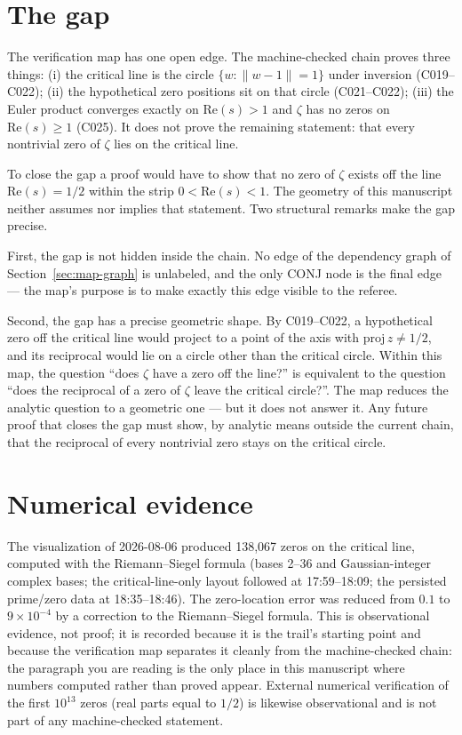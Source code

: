 \documentclass[sigplan,10pt,anonymous,review]{acmart}
\begin{document}
\section{The gap}\label{sec:gap}

The verification map has one open edge. The machine-checked chain proves
three things: (i) the critical line is the circle $\{w : \|w - 1\| =
1\}$ under inversion (C019--C022); (ii) the hypothetical zero positions
sit on that circle (C021--C022); (iii) the Euler product converges
exactly on $\mathrm{Re}(s) > 1$ and $\zeta$ has no zeros on
$\mathrm{Re}(s) \ge 1$ (C025). It does not prove the remaining
statement: that every nontrivial zero of $\zeta$ lies on the critical
line.

To close the gap a proof would have to show that no zero of $\zeta$
exists off the line $\mathrm{Re}(s) = 1/2$ within the strip
$0 < \mathrm{Re}(s) < 1$. The geometry of this manuscript neither
assumes nor implies that statement. Two structural remarks make the gap
precise.

First, the gap is not hidden inside the chain. No edge of the dependency
graph of Section~\ref{sec:map-graph} is unlabeled, and the only
\textcolor{conj}{CONJ} node is the final edge --- the map's purpose is
to make exactly this edge visible to the referee.

Second, the gap has a precise geometric shape. By C019--C022, a
hypothetical zero off the critical line would project to a point of the
axis with $\mathrm{proj}\, z \ne 1/2$, and its reciprocal would lie on a
circle other than the critical circle. Within this map, the question
``does $\zeta$ have a zero off the line?'' is equivalent to the question
``does the reciprocal of a zero of $\zeta$ leave the critical circle?''.
The map reduces the analytic question to a geometric one --- but it does
not answer it. Any future proof that closes the gap must show, by
analytic means outside the current chain, that the reciprocal of every
nontrivial zero stays on the critical circle.

\section{Numerical evidence}

The visualization of 2026-08-06 produced 138{,}067 zeros on the critical
line, computed with the Riemann--Siegel formula (bases 2--36 and
Gaussian-integer complex bases; the critical-line-only layout followed at
17:59--18:09; the persisted prime/zero data at 18:35--18:46). The
zero-location error was reduced from $0.1$ to $9 \times 10^{-4}$ by a
correction to the Riemann--Siegel formula. This is observational
evidence, not proof; it is recorded because it is the trail's starting
point and because the verification map separates it cleanly from the
machine-checked chain: the paragraph you are reading is the only place
in this manuscript where numbers computed rather than proved appear.
External numerical verification of the first $10^{13}$ zeros (real parts
equal to $1/2$) is likewise observational and is not part of any
machine-checked statement.
\end{document}
